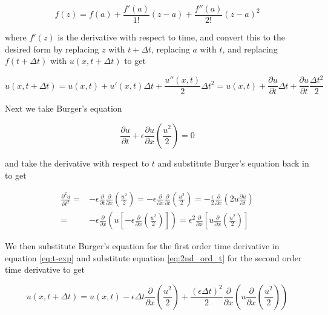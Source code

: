 \documentclass{article}
\begin{document}
\begin{equation}
	f(z) = f(a) + \frac{f'(a)}{1!}(z-a) + \frac{f''(a)}{2!}(z-a)^2
\end{equation}

where $f'(z)$ is the derivative with respect to time, and convert this to the desired form by replacing $z$ with $t+\Delta t$, replacing $a$ with $t$, and replacing $f(t+\Delta t)$ with $u(x, t+\Delta t)$ to get

\begin{equation}
	\label{eq:t-exp}
	u(x,t+\Delta t) = u(x,t) + u'(x,t)\Delta t + \frac{u''(x,t)}{2}\Delta t^2
	= u(x,t) + \frac{\partial u}{\partial t}\Delta t + \frac{\partial u}{\partial t}\frac{\Delta t^2}{2}
\end{equation}

Next we take Burger's equation

\begin{equation}
	\frac{\partial u}{\partial t}+\epsilon \frac{\partial u}{\partial x} \left(\frac{u^2}{2}\right) = 0
\end{equation}

and take the derivative with respect to $t$  and substitute Burger's equation back in to get

\begin{equation}
\begin{split}
	\label{eq:2nd_ord_t}
	\frac{\partial^2 u }{\partial t^2} =& - \epsilon \frac{\partial }{\partial t}\frac{\partial }{\partial x} \left(\frac{u^2}{2} \right)
	= - \epsilon \frac{\partial }{\partial x}\frac{\partial }{\partial t} \left(\frac{u^2}{2} \right)
	= - \frac{\epsilon}{2} \frac{\partial }{\partial x}\left( 2u\frac{\partial u}{\partial t} \right)
	\\ =& - \epsilon \frac{\partial }{\partial x} \left( u \left[ -\epsilon \frac{\partial }{\partial x} \left(\frac{u^2}{2} \right) \right] \right)
	= \epsilon^2 \frac{\partial}{\partial x} \left[u \frac{\partial}{\partial x}\left( \frac{u^2}{2}\right) \right]
\end{split}
\end{equation}

We then substitute Burger's equation for the first order time derivative in equation \ref{eq:t-exp} and substitute equation \ref{eq:2nd_ord_t} for the second order time derivative to get

\begin{equation}
	\label{eq:t_exp_2}
	u(x,t+\Delta t) = u(x,t) - \epsilon \Delta t \frac{\partial }{\partial x} \left(\frac{u^2}{2}\right) + \frac{(\epsilon\Delta t)^2}{2}\frac{\partial}{\partial x }\left(u\frac{\partial}{\partial x}\left(\frac{u^2}{2}\right) \right)
\end{equation}
\end{document}
